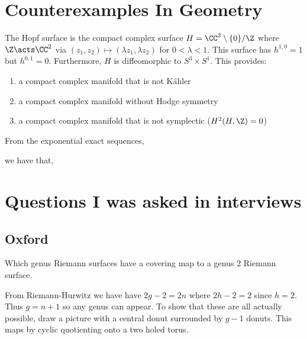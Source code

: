 \documentclass[12pt]{article}
\begin{document}
\section{Counterexamples In Geometry}

\begin{example}
The Hopf surface is the compact complex surface $H = \CC^2 \setminus \{ 0 \} / \Z$ where $\Z \acts \CC^2$ via $(z_1, z_2) \mapsto  (\lambda z_1, \lambda z_2)$ for $0 < \lambda < 1$. This surface has $h^{1,0} = 1$ but $h^{0,1} = 0$. Furthermore, $H$ is diffeomorphic to $S^3 \times S^1$. This provides:
\begin{enumerate}
\item a compact complex manifold that is not K\"{a}hler
\item a compact complex manifold without Hodge symmetry 
\item a compact complex manifold that is not symplectic ($H^2(H, \Z) = 0$)
\end{enumerate}
\end{example}

\begin{rmk}
From the exponential exact sequences,
\begin{center}
\end{center}
we have that,
\begin{center}
\begin{tikzcd}

\end{tikzcd}
\end{center}
\end{rmk}

\section{Questions I was asked in interviews}

\subsection{Oxford}

\begin{exercise}
Which genus Riemann surfaces have a covering map to a genus $2$ Riemann surface.
\end{exercise}

From Riemann-Hurwitz we have have $2 g - 2 = 2 n$ where $2h - 2 = 2$ since $h = 2$. Thus $g = n + 1$ so any genus can appear. To show that these are all actually possible, draw a picture with a central donut surrounded by $g-1$ donuts. This maps by cyclic quotienting onto a two holed torus.
\end{document}
